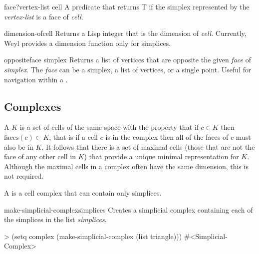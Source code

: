 \begin{methoddef}{face?}{vertex-list cell}
A predicate that returns {\sf T} if the simplex represented by the
{\em vertex-list} is a face of {\em cell}.
\end{methoddef}

  
\begin{methoddef}{dimension-of}{cell}
Returns a Lisp integer that is the dimension of {\em cell}.
Currently, Weyl provides a dimension function only for simplices.
\end{methoddef}

\begin{methoddef}{opposite}{face simplex}
Returns a list of vertices that are opposite the given {\em face} of
{\em simplex}.  The {\em face} can be a simplex, a list of vertices,
or a single point.  Useful for navigation within a .
\end{methoddef}

\subsection{Complexes}
  
A  $K$ is a set of cells of the same
space with the property that if $c \in K$ then $\mbox{faces}(c)
\subset K$, that is if a cell $c$ is in the complex then all of the
faces of $c$ must also be in $K$.  It follows that there is a set of
maximal cells (those that are not the face of any other cell in
$K$) that provide a unique minimal representation for $K$. Although
the maximal cells in a complex often have the same dimension, this is
not required.

A  is a cell complex that can contain only
simplices.
  
\begin{functiondef}{make-simplicial-complex}{simplices}
Creates a simplicial complex containing each of the simplices in the
list {\em simplices}.
\begin{code}
> (setq complex (make-simplicial-complex (list triangle)))
#<Simplicial-Complex>
\end{code}
\end{functiondef}

